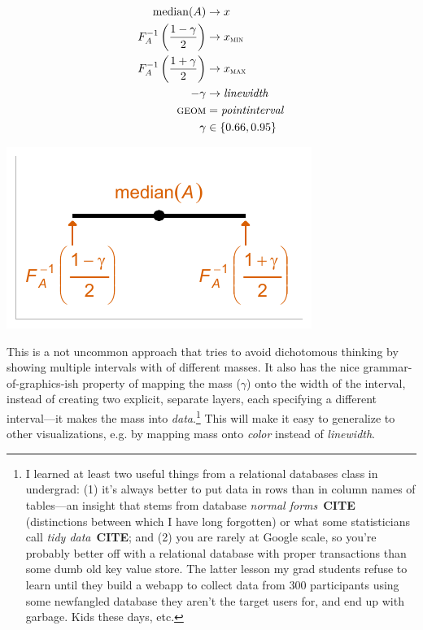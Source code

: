 \documentclass[journal]{vgtc}                     %
\begin{document}
\begin{minipage}{.5\columnwidth}

\begin{align*}
\operatorname{median}(A) &\rightarrow x\\
F_A^{-1}\left(\frac{1 - \gamma}{2}\right) &\rightarrow x_\textsc{min}\\
F_A^{-1}\left(\frac{1 + \gamma}{2}\right) &\rightarrow x_\textsc{max}\\
-\gamma &\rightarrow \mathit{linewidth}\\
\textsc{geom} &= \mathit{pointinterval}\\
\gamma &\in \{0.66, 0.95\}
\end{align*}
\end{minipage}%
  \begin{minipage}{.4\columnwidth}
    \centering
    \includegraphics[width=1.2\columnwidth]{figs/3-geom_pointinterval_quantiles.pdf}
  \end{minipage}
\hfill\break

This is a not uncommon approach that tries to avoid dichotomous thinking by showing multiple intervals with of different masses. It also has the nice grammar-of-graphics-ish property of mapping the mass ($\gamma$) onto the width of the interval, instead of creating two explicit, separate layers, each specifying a different interval---it makes the mass into \textit{data}.\footnote{I learned at least two useful things from a relational databases class in undergrad: (1) it's always better to put data in rows than in column names of tables---an insight that stems from database \textit{normal forms}~\textbf{CITE} (distinctions between which I have long forgotten) or what some statisticians call \textit{tidy data}~\textbf{CITE}; and (2) you are rarely at Google scale, so you're probably better off with a relational database with proper transactions than some dumb old key value store. The latter lesson my grad students refuse to learn until they build a webapp to collect data from 300 participants using some newfangled database they aren't the target users for, and end up with garbage. Kids these days, etc.} This will make it easy to generalize to other visualizations, e.g. by mapping mass onto \textit{color} instead of \textit{linewidth}.
\end{document}

